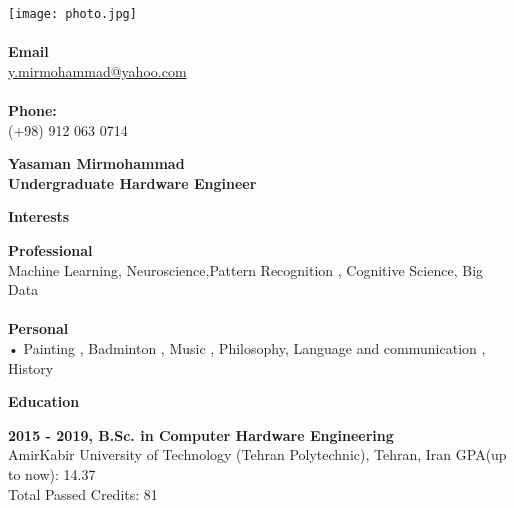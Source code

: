 \documentclass[a4paper,12pt,final]{memoir}
\newcommand{\Sep}{\vspace{1.5em}}
\newcommand{\SmallSep}{\vspace{0.5em}}
\newenvironment{AboutMe}
	{\ignorespaces\textbf{\color{RoyalBlue} About me}}
	{\Sep\ignorespacesafterend}
\newcommand{\CVSection}[1]
	{\Large\textbf{#1}\par
	\SmallSep\normalsize\normalfont}
\newcommand{\CVItem}[1]
	{\textbf{\color{RoyalBlue} #1}}
\begin{document}


\begin{flushright}\small

	\texttt{[image: photo.jpg]}\\[\baselineskip] %
	 \CVItem{\\Email} \\
	 
	\url{y.mirmohammad@yahoo.com}  \\
	 \CVItem{\\Phone:} \\
         (+98) 912 063 0714  \\


	
\end{flushright}\normalsize
\framebreak


\Huge\bfseries {\color{RoyalBlue} Yasaman Mirmohammad} \\
\Large\bfseries  Undergraduate Hardware Engineer \\

\normalsize\normalfont


\CVSection{Interests}
	\CVItem{Professional}
	\\
 Machine Learning, Neuroscience,Pattern Recognition , Cognitive Science, Big Data \\
	   
	\\
	\CVItem{Personal}
	\\
	•	Painting , Badminton , Music ,  Philosophy, Language  and communication , History
	
\Sep

\CVSection{Education}
\CVItem{2015 - 2019, B.Sc. in Computer Hardware Engineering}\\
AmirKabir University of Technology (Tehran Polytechnic), Tehran, Iran
GPA(up to now): 14.37 \\
Total Passed Credits: 81
\SmallSep
\end{document}
